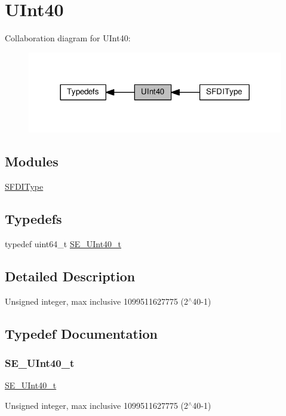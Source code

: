 \hypertarget{group__UInt40}{}\section{U\+Int40}
\label{group__UInt40}
Collaboration diagram for U\+Int40\+:\nopagebreak
\begin{figure}[H]
\begin{center}
\leavevmode
\includegraphics[width=317pt]{group__UInt40}
\end{center}
\end{figure}
\subsection*{Modules}
\begin{DoxyCompactItemize}
\item 
\hyperlink{group__SFDIType}{S\+F\+D\+I\+Type}
\end{DoxyCompactItemize}
\subsection*{Typedefs}
\begin{DoxyCompactItemize}
\item 
typedef uint64\+\_\+t \hyperlink{group__UInt40_ga918cbd196341a025cebbfa392d221ab7}{S\+E\+\_\+\+U\+Int40\+\_\+t}
\end{DoxyCompactItemize}


\subsection{Detailed Description}
Unsigned integer, max inclusive 1099511627775 (2$^\wedge$40-\/1) 

\subsection{Typedef Documentation}
\mbox{\label{group__UInt40_ga918cbd196341a025cebbfa392d221ab7}} 
\subsubsection{\texorpdfstring{S\+E\+\_\+\+U\+Int40\+\_\+t}{SE\_UInt40\_t}}
{\footnotesize\ttfamily \hyperlink{group__UInt40_ga918cbd196341a025cebbfa392d221ab7}{S\+E\+\_\+\+U\+Int40\+\_\+t}}

Unsigned integer, max inclusive 1099511627775 (2$^\wedge$40-\/1) 